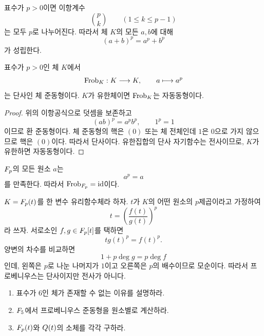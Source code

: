 표수가 $p>0$이면 이항계수
\[
  \binom pk
  \qquad(1\le k\le p-1)
\]
는 모두 $p$로 나누어진다. 따라서 체 $K$의 모든 $a,b$에 대해
\[
  (a+b)^p=a^p+b^p
\]
가 성립한다.

\begin{theorem}
표수가 $p>0$인 체 $K$에서
\[
  \operatorname{Frob}_K:K\longrightarrow K,
  \qquad
  a\longmapsto a^p
\]
는 단사인 체 준동형이다. $K$가 유한체이면 $\operatorname{Frob}_K$는 자동동형이다.
\end{theorem}

\begin{proof}
위의 이항공식으로 덧셈을 보존하고
\[
  (ab)^p=a^pb^p,
  \qquad
  1^p=1
\]
이므로 환 준동형이다. 체 준동형의 핵은 $(0)$ 또는 체 전체인데 $1$은 $0$으로 가지 않으므로 핵은 $(0)$이다. 따라서 단사이다. 유한집합의 단사 자기함수는 전사이므로, $K$가 유한하면 자동동형이다.
\end{proof}

\begin{example}
$F_p$의 모든 원소 $a$는
\[
  a^p=a
\]
를 만족한다. 따라서 $\operatorname{Frob}_{F_p}=\operatorname{id}$이다.
\end{example}

\begin{example}
$K=F_p(t)$를 한 변수 유리함수체라 하자. $t$가 $K$의 어떤 원소의 $p$제곱이라고 가정하여
\[
  t=\left(\frac{f(t)}{g(t)}\right)^p
\]
라 쓰자. 서로소인 $f,g\in F_p[t]$를 택하면
\[
  t g(t)^p=f(t)^p.
\]
양변의 차수를 비교하면
\[
  1+p\deg g=p\deg f
\]
인데, 왼쪽은 $p$로 나눈 나머지가 $1$이고 오른쪽은 $p$의 배수이므로 모순이다. 따라서 프로베니우스는 단사이지만 전사가 아니다.
\end{example}

\begin{checkpoint}
\begin{enumerate}[label=(\alph*)]
  \item 표수가 $6$인 체가 존재할 수 없는 이유를 설명하라.
  \item $F_5$에서 프로베니우스 준동형을 원소별로 계산하라.
  \item $F_p(t)$와 $Q(t)$의 소체를 각각 구하라.
\end{enumerate}
\end{checkpoint}

